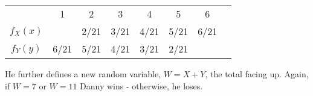 \documentclass[addpoints]{examsetup}\usepackage[]{graphicx}\usepackage[]{color}
\begin{document}
\begin{questions}





\begin{table}[h]
   \centering
   \begin{tabular}{cccccccc}
      & 1 & 2 & 3 & 4 & 5 & 6 \\
      $f_{X}(x)$ &               & 2/21 & 3/21 & 4/21 & 5/21 & 6/21 \\
      $f_{Y}(y)$ & 6/21 & 5/21 & 4/21 & 3/21 & 2/21 &               \\
   \end{tabular}
\end{table}

He further defines a new random variable, $W = X + Y$, the total facing up. Again, if $W = 7$ or $W = 11$ Danny wins - otherwise, he loses.

\end{questions}
\end{document}
